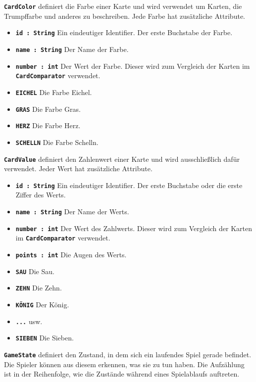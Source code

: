\documentclass[
							a4paper, 
							11pt, 
							openany, 
							liststotoc,
							parskip=half, 
   							headings=normal
						]{scrreprt}
\begin{document}
{\textbf{\texttt{CardColor}} definiert die Farbe einer Karte und wird verwendet um Karten, die Trumpffarbe und anderes zu beschreiben. Jede Farbe hat zusätzliche Attribute.

\begin{itemize}
	\item \textbf{\texttt{id : String}} Ein eindeutiger Identifier. Der erste Buchstabe der Farbe.
	\item \textbf{\texttt{name : String}} Der Name der Farbe.
	\item \textbf{\texttt{number : int}} Der Wert der Farbe. Dieser wird zum Vergleich der Karten im \textbf{\texttt{CardComparator}} verwendet.
	\item \textbf{\texttt{EICHEL}} Die Farbe Eichel.
	\item \textbf{\texttt{GRAS}}	Die Farbe Gras.
	\item \textbf{\texttt{HERZ}} Die Farbe Herz.
	\item \textbf{\texttt{SCHELLN}} Die Farbe Schelln.
\end{itemize}\bigskip

\textbf{\texttt{CardValue}} definiert den Zahlenwert einer Karte und wird ausschließlich dafür verwendet. Jeder Wert hat zusätzliche Attribute.

\begin{itemize}
	\item \textbf{\texttt{id : String}} Ein eindeutiger Identifier. Der erste Buchstabe oder die erste Ziffer des Werts.
	\item \textbf{\texttt{name : String}} Der Name der Werts.
	\item \textbf{\texttt{number : int}} Der Wert des Zahlwerts. Dieser wird zum Vergleich der Karten im \textbf{\texttt{CardComparator}} verwendet.
	\item \textbf{\texttt{points : int}} Die Augen des Werts.
	\item \textbf{\texttt{SAU}} Die Sau.
	\item \textbf{\texttt{ZEHN}}	Die Zehn.
	\item \textbf{\texttt{KÖNIG}} Der König.
	\item \textbf{\texttt{...}} usw.
	\item \textbf{\texttt{SIEBEN}} Die Sieben.
\end{itemize}\bigskip

\textbf{\texttt{GameState}} definiert den Zustand, in dem sich ein laufendes Spiel gerade befindet. Die Spieler können aus diesem erkennen, was sie zu tun haben. Die Aufzählung ist in der Reihenfolge, wie die Zustände während eines Spielablaufs auftreten.

}
\end{document}

